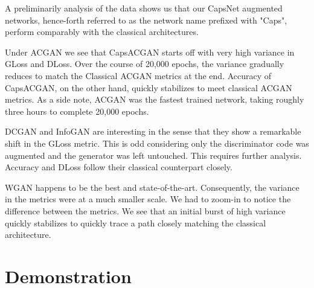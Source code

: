 A preliminarily analysis of the data shows us that our CapsNet augmented networks, hence-forth referred to as the network name prefixed with "Caps", perform comparably with the classical architectures. 
\par\bigskip

Under ACGAN we see that CapsACGAN starts off with very high variance in GLoss and DLoss. Over the course of 20,000 epochs, the variance gradually reduces to match the Classical ACGAN metrics at the end. Accuracy of CapsACGAN, on the other hand, quickly stabilizes to meet classical ACGAN metrics. As a side note, ACGAN was the fastest trained network, taking roughly three hours to complete 20,000 epochs.
\par\bigskip

DCGAN and InfoGAN are interesting in the sense that they show a remarkable shift in the GLoss metric. This is odd considering only the discriminator code was augmented and the generator was left untouched. This requires further analysis. Accuracy and DLoss follow their classical counterpart closely.
\par\bigskip

WGAN happens to be the best and state-of-the-art. Consequently, the variance in the metrics were at a much smaller scale. We had to zoom-in to notice the difference between the metrics. We see that an initial burst of high variance quickly stabilizes to quickly trace a path closely matching the classical architecture.
\par\bigskip



\section{Demonstration} %
\label{sec:demonstration}

